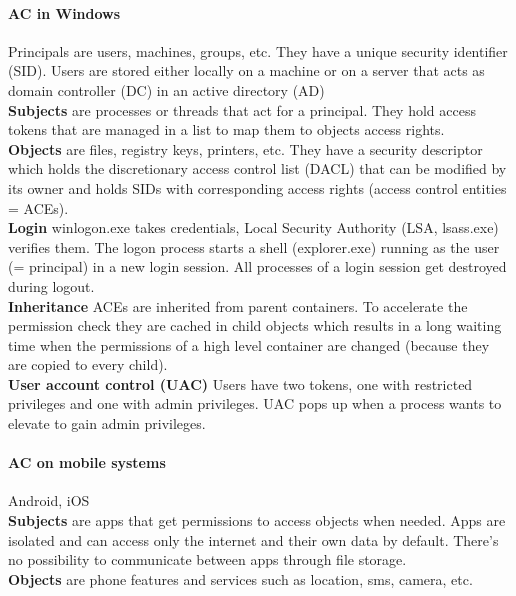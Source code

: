 \documentclass[12pt]{article}
\begin{document}
	\paragraph{AC in Windows} Principals are users, machines, groups, etc. They have a unique security identifier (SID). Users are stored either locally on a machine or on a server that acts as domain controller (DC) in an active directory (AD)\\
	\textbf{Subjects} are processes or threads that act for a principal. They hold access tokens that are managed in a list to map them to objects access rights.\\
	\textbf{Objects} are files, registry keys, printers, etc. They have a security descriptor which holds the discretionary access control list (DACL) that can be modified by its owner and holds SIDs with corresponding access rights (access control entities = ACEs).\\
	\textbf{Login} winlogon.exe takes credentials, Local Security Authority (LSA, lsass.exe) verifies them. The logon process starts a shell (explorer.exe) running as the user (= principal) in a new login session. All processes of a login session get destroyed during logout.\\
	\textbf{Inheritance} ACEs are inherited from parent containers. To accelerate the permission check they are cached in child objects which results in a long waiting time when the permissions of a high level container are changed (because they are copied to every child).\\
	\textbf{User account control (UAC)} Users have two tokens, one with restricted privileges and one with admin privileges. UAC pops up when a process wants to elevate to gain admin privileges.
	
	\paragraph{AC on mobile systems} Android, iOS\\
	\textbf{Subjects} are apps that get permissions to access objects when needed. Apps are isolated and can access only the internet and their own data by default. There's no possibility to communicate between apps through file storage.\\
	\textbf{Objects} are phone features and services such as location, sms, camera, etc.
	
	
\end{document}
